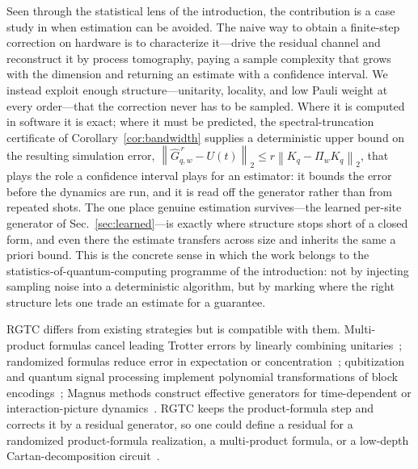 \documentclass[aps,prxquantum,reprint,superscriptaddress,nofootinbib,amsmath,amssymb]{revtex4-2}
\newcommand{\rgtc}{RGTC}
\newcommand{\norm}[1]{\left\lVert #1 \right\rVert}
\begin{document}
Seen through the statistical lens of the introduction, the contribution is a case study in when estimation can be avoided. The naive way to obtain a finite-step correction on hardware is to characterize it---drive the residual channel and reconstruct it by process tomography, paying a sample complexity that grows with the dimension and returning an estimate with a confidence interval. We instead exploit enough structure---unitarity, locality, and low Pauli weight at every order---that the correction never has to be sampled. Where it is computed in software it is exact; where it must be predicted, the spectral-truncation certificate of Corollary~\ref{cor:bandwidth} supplies a deterministic upper bound on the resulting simulation error, $\norm{\widehat G_{q,w}^{\,r}-U(t)}_2\leq r\norm{K_q-\Pi_wK_q}_2$, that plays the role a confidence interval plays for an estimator: it bounds the error before the dynamics are run, and it is read off the generator rather than from repeated shots. The one place genuine estimation survives---the learned per-site generator of Sec.~\ref{sec:learned}---is exactly where structure stops short of a closed form, and even there the estimate transfers across size and inherits the same a priori bound. This is the concrete sense in which the work belongs to the statistics-of-quantum-computing programme of the introduction: not by injecting sampling noise into a deterministic algorithm, but by marking where the right structure lets one trade an estimate for a guarantee.

\rgtc{} differs from existing strategies but is compatible with them. Multi-product formulas cancel leading Trotter errors by linearly combining unitaries~\cite{childs2012mpf}; randomized formulas reduce error in expectation or concentration~\cite{campbell2019,ouyang2020,childs2022,chen2022a}; qubitization and quantum signal processing implement polynomial transformations of block encodings~\cite{berry2007,berry2014,low2017qsp,low2019qubitization}; Magnus methods construct effective generators for time-dependent or interaction-picture dynamics~\cite{magnus1954,blanes2009,sharma2024,fang2025}. \rgtc{} keeps the product-formula step and corrects it by a residual generator, so one could define a residual for a randomized product-formula realization, a multi-product formula, or a low-depth Cartan-decomposition circuit~\cite{kokcu2022,steckmann2023}.
\end{document}
